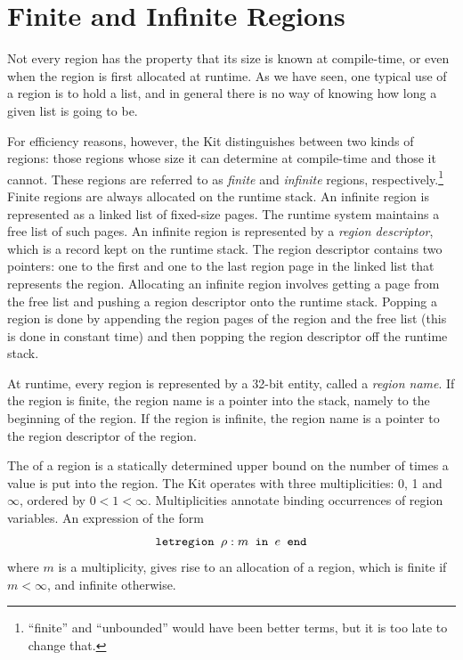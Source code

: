 \documentclass[12pt]{book}
\begin{document}
\section{Finite and Infinite Regions}
\label{fininf.sec}
Not every region has the property that its size is known at
compile-time, or even when the region is first allocated at runtime.
As we have seen, one typical use of a region is to hold a list, and in
general there is no way of knowing how long a given list is going to
be.


For efficiency reasons, however, the Kit distinguishes between two
kinds of regions: those regions whose size it can determine at
compile-time and those it cannot.
%
These regions are referred to as 
%
{\em finite} and 
%
{\em infinite} regions, respectively.\footnote{``finite'' and
  ``unbounded'' would have been better terms, but it is too late to
  change that.}  Finite regions are always allocated on the
%
runtime stack.  An infinite region is represented as a linked list of
fixed-size 
%
pages.  The runtime system maintains a free list of such pages. An
infinite region is represented by a 
%
{\em region descriptor}, which is a record kept on the runtime stack.
The region descriptor contains two pointers: one to the first and one
to the last region page in the linked list that represents the region.
Allocating an infinite region involves getting a page from the
%
free list and pushing a region descriptor onto the
runtime stack. Popping a region is done by appending the region pages
of the region and the free list (this is done in constant time) and
then popping the region descriptor off the runtime stack.

At runtime, every region is represented by a 32-bit entity, called a
%
{\em region name}. If the region is finite, the region name is a
pointer into the stack, namely to the beginning of the region. If the
region is infinite, the region name is a pointer to the region
descriptor of the region.

The  of a region is a statically
determined upper bound on the number of times a value is put into the
region. The Kit operates with three multiplicities: 0, 1 and $\infty$,
ordered by $0<1<\infty$. Multiplicities annotate binding occurrences
of region variables. An expression of the form
$$\hbox{\tt letregion $\rho:m$ in $e$ end}$$
where $m$ is a multiplicity,
gives rise to an allocation of a region, which is finite if $m<\infty$, and
infinite otherwise.
\end{document}

